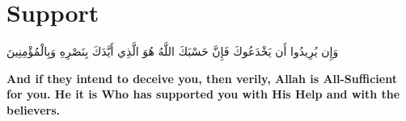 \chapter{Support}
\begin{center}
    {\Huge    
        \begin{Arabic}
            وَإِن يُرِيدُوا أَن يَخْدَعُوكَ فَإِنَّ حَسْبَكَ اللَّهُ هُوَ الَّذِي أَيَّدَكَ بِنَصْرِهِ وَبِالْمُؤْمِنِينَ
        \end{Arabic}
    }    
\end{center}
\vspace*{\fill}
\vspace{3cm}
\begin{center}
    \large \textbf{And if they intend to deceive you, then verily, Allah is All-Sufficient for you. He it is Who has supported you with His Help and with the believers.}
\end{center}
